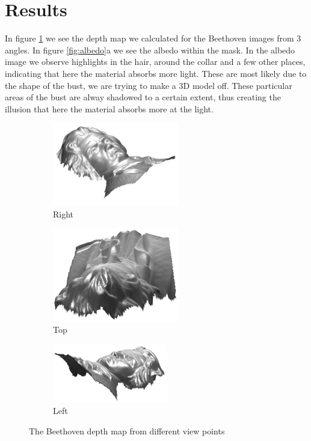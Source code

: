 \documentclass[12pt,a4paper,oneside,final]{article}
\begin{document}
\section{Results}
In figure \ref{fig:BeethovenDepth} we see the depth map we calculated for the Beethoven images from 3 angles. In figure \ref{fig:albedo}a we see the albedo within the mask. In the albedo image we observe highlights in the hair, around the collar and a few other places, indicating that here the material absorbs more light. These are most likely due to the shape of the bust, we are trying to make a 3D model off. These particular areas of the bust are alway shadowed to a certain extent, thus creating the illusion that here the material absorbs more at the light. 
\begin{figure}[H]
	\centering
	\begin{subfigure}{.33\textwidth}
		\centering
		\includegraphics[width=5.5cm]{Beethoven1}
		\caption{Right}
	\end{subfigure}%
	\begin{subfigure}{.33\textwidth}
		\centering
		\includegraphics[width=5.5cm]{Beethoven2}
		\caption{Top}
	\end{subfigure}%
	\begin{subfigure}{.33\textwidth}
		\centering
		\includegraphics[width=5cm]{Beethoven3}
		\caption{Left}
	\end{subfigure}
	\caption{The Beethoven depth map from different view points}
	\label{fig:BeethovenDepth}
\end{figure}
\end{document}
